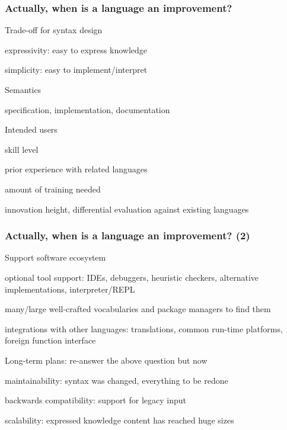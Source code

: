 \begin{frame}\frametitle{Actually, when is a language an improvement?}
\begin{blockitems}{Trade-off for syntax design}
  \item expressivity: easy to express knowledge
  \item simplicity: easy to implement/interpret
 \end{blockitems}

\begin{blockitems}{Semantics}
\item specification, implementation, documentation
\end{blockitems}

\begin{blockitems}{Intended users}
  \item skill level
  \item prior experience with related languages
  \item amount of training needed
  \item innovation height, differential evaluation against existing languages
\end{blockitems}
\end{frame}

\begin{frame}\frametitle{Actually, when is a language an improvement? (2)}
\begin{blockitems}{Support software ecosystem}
  \item optional tool support: IDEs, debuggers, heuristic checkers, alternative implementations, interpreter/REPL
  \item many/large well-crafted vocabularies and package managers to find them
  \item integrations with other languages: translations, common run-time platforms, foreign function interface
\end{blockitems}

\begin{blockitems}{Long-term plans: re-answer the above question but now}
  \item maintainability: syntax was changed, everything to be redone
  \item backwards compatibility: support for legacy input
  \item scalability: expressed knowledge content has reached huge sizes
\end{blockitems}
\end{frame}

